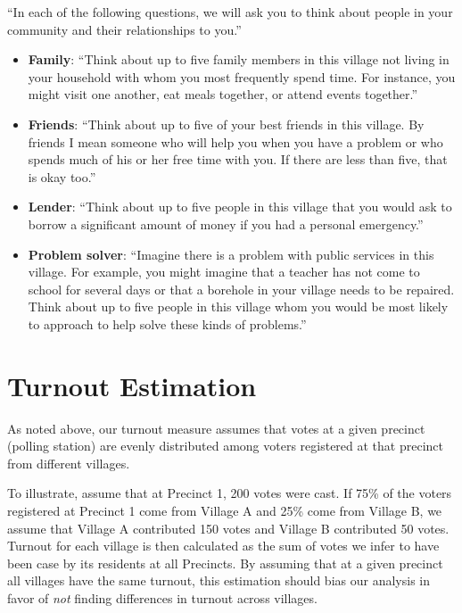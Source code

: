 \documentclass[12pt]{article}
\begin{document}
\begin{appendix}
``In each of the following questions, we will ask you to think about people in your community and their relationships to you.''
\begin{itemize}

\item {\bf Family}: ``Think about up to five family members in this village not living in your household with whom you most frequently spend time. For instance, you might visit one another, eat meals together, or attend events together.''

\item {\bf Friends}:	``Think about up to five of your best friends in this village. By friends I mean someone who will help you when you have a problem or who spends much of his or her free time with you. If there are less than five, that is okay too.''

\item {\bf Lender}: ``Think about up to five people in this village that you would ask to borrow a significant amount of money if you had a personal emergency.''

\item {\bf Problem solver}: ``Imagine there is a problem with public services in this village. For example, you might imagine that a teacher has not come to school for several days or that a borehole in your village needs to be repaired. Think about up to five people in this village whom you would be most likely to approach to help solve these kinds of problems.''
\end{itemize}



\section{Turnout Estimation}\label{appendix_turnout_extrapolation}

As noted above, our turnout measure assumes that votes at a given precinct (polling station) are evenly distributed among voters registered at that precinct from different villages.

To illustrate, assume that at Precinct 1, 200 votes were cast. If 75\% of the voters registered at Precinct 1 come from Village A and 25\% come from Village B, we assume that Village A contributed 150 votes and Village B contributed 50 votes. Turnout for each village is then calculated as the sum of votes we infer to have been case by its residents at all Precincts. By assuming that at a given precinct all villages have the same turnout, this estimation should bias our analysis in favor of \emph{not} finding differences in turnout across villages.


\end{appendix}
\end{document}
